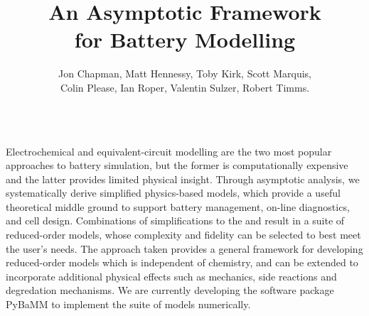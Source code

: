 \documentclass{beamer}
\author[]{
  	Jon Chapman,
  	Matt Hennessy,
  	Toby Kirk,
	Scott Marquis,\\
  	Colin Please,
  	Ian Roper,
	Valentin Sulzer,
	Robert Timms.
}
\title{An Asymptotic Framework\\ for Battery Modelling}
\institute{Your Institution}
\begin{document}
\begin{frame}[fragile]
\centering

\vspace{-2em}
\begin{columns}
  \begin{column}{0.9\linewidth}
	\begin{topblock}{}
	  \small

Electrochemical and equivalent-circuit modelling are the two most popular approaches to battery simulation, but the former is computationally expensive and the latter provides limited physical insight. Through asymptotic analysis, we systematically derive simplified physics-based models, which provide a useful theoretical middle ground to support battery management, on-line diagnostics, and cell design. Combinations of simplifications to the {} and {} result in a suite of reduced-order models, whose complexity and fidelity can be selected to best meet the user's needs. The approach taken provides a general framework for developing reduced-order models which is independent of chemistry, and can be extended to incorporate additional physical effects such as mechanics, side reactions and degredation mechanisms. We are currently developing the software package PyBaMM to implement the suite of models numerically.


\end{topblock}
  \end{column}
\end{columns}




\end{frame}
\end{document}
